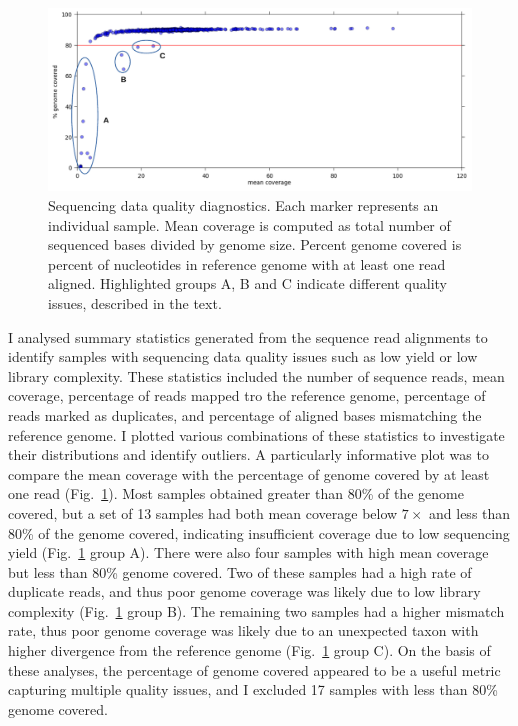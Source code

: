 \begin{refsection}
\begin{figure}[t!]
\centering
\includegraphics[width=\textwidth]{artwork/chapter3/coverage.pdf}
\caption{Sequencing data quality diagnostics.
%
Each marker represents an individual sample.
%
Mean coverage is computed as total number of sequenced bases divided by genome size.
%
Percent genome covered is percent of nucleotides in reference genome with at least one read aligned.
%
Highlighted groups A, B and C indicate different quality issues, described in the text.
}
%
\label{fig:ch3-coverage}
\end{figure}


I analysed summary statistics generated from the sequence read alignments to identify samples with sequencing data quality issues such as low yield or low library complexity.
%
These statistics included the number of sequence reads, mean coverage, percentage of reads mapped tro the reference genome, percentage of reads marked as duplicates, and percentage of aligned bases mismatching the reference genome.
%
I plotted various combinations of these statistics to investigate their distributions and identify outliers.
%
A particularly informative plot was to compare the mean coverage with the percentage of genome covered by at least one read (Fig.~\ref{fig:ch3-coverage}).
%
Most samples obtained greater than 80\% of the genome covered, but a set of 13 samples had both mean coverage below $7\times$ and less than 80\% of the genome covered, indicating insufficient coverage due to low sequencing yield (Fig.~\ref{fig:ch3-coverage} group A).
%
There were also four samples with high mean coverage but less than 80\% genome covered.
%
Two of these samples had a high rate of duplicate reads, and thus poor genome coverage was likely due to low library complexity (Fig.~\ref{fig:ch3-coverage} group B).
%
The remaining two samples had a higher mismatch rate, thus poor genome coverage was likely due to an unexpected taxon with higher divergence from the reference genome (Fig.~\ref{fig:ch3-coverage} group C).
%
On the basis of these analyses, the percentage of genome covered appeared to be a useful metric capturing multiple quality issues, and I excluded 17 samples with less than 80\% genome covered.
%



\end{refsection}
